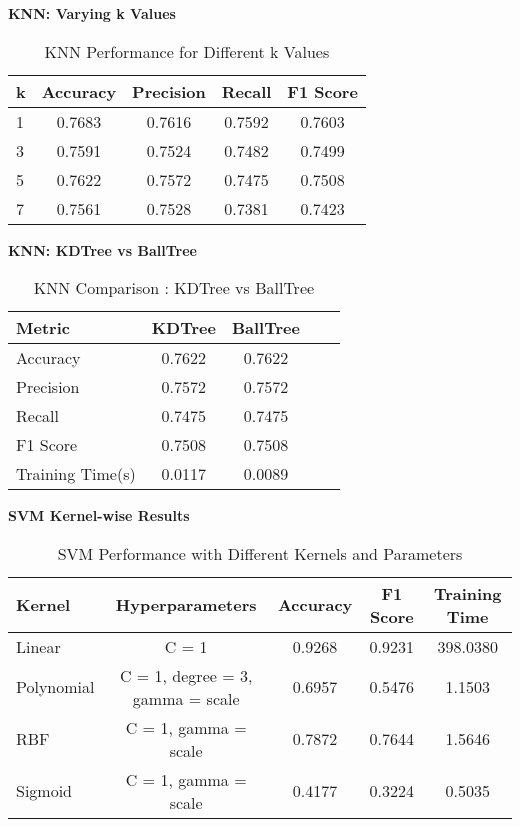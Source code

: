 \documentclass[11pt]{article}
\begin{document}
\vspace{0.5cm}
\noindent
\textbf{KNN: Varying k Values} \\
\begin{table}[h!]
\centering
\begin{tabular}{|l|c|c|c|c|}
\hline
\textbf{k} & \textbf{Accuracy} & \textbf{Precision} & \textbf{Recall} & \textbf{F1 Score}\\
\hline
1 & 0.7683 & 0.7616 & 0.7592 & 0.7603 \\
3 & 0.7591 & 0.7524 & 0.7482 & 0.7499 \\
5 & 0.7622 & 0.7572 & 0.7475 & 0.7508 \\
7 & 0.7561 & 0.7528 & 0.7381 & 0.7423 \\
\hline
\end{tabular}
\caption{KNN Performance for Different k Values}
\end{table}

\vspace{0.5cm}
\noindent
\textbf{KNN: KDTree vs BallTree} \\
\begin{table}[h!]
\centering
\begin{tabular}{|l|c|c|c|c|}
\hline
\textbf{Metric} & \textbf{KDTree} & \textbf{BallTree}\\
\hline
Accuracy & 0.7622 & 0.7622 \\
Precision & 0.7572 & 0.7572 \\
Recall & 0.7475 & 0.7475 \\
F1 Score & 0.7508 & 0.7508 \\
Training Time(s) & 0.0117 & 0.0089 \\
\hline
\end{tabular}
\caption{KNN Comparison : KDTree vs BallTree}
\end{table}

\vspace{0.5cm}
\noindent
\textbf{SVM Kernel-wise Results} \\
\begin{table}[h!]
\centering
\begin{tabular}{|l|c|c|c|c|}
\hline
\textbf{Kernel} & \textbf{Hyperparameters} & \textbf{Accuracy} & \textbf{F1 Score} & \textbf{Training Time}\\
\hline
Linear & C = 1 & 0.9268 & 0.9231 & 398.0380\\
Polynomial & C = 1, degree = 3, gamma = scale & 0.6957 & 0.5476 & 1.1503\\
RBF & C = 1, gamma = scale & 0.7872 & 0.7644 & 1.5646\\
Sigmoid & C = 1, gamma = scale & 0.4177 & 0.3224 & 0.5035\\
\hline
\end{tabular}
\caption{SVM Performance with Different Kernels and Parameters}
\end{table}
\end{document}
